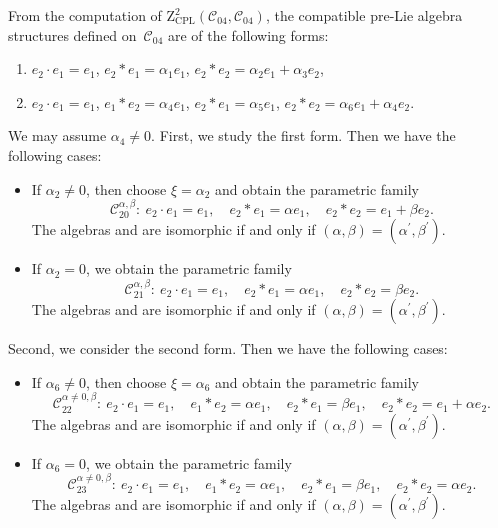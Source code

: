 \documentclass[pdftex]{sigma}
\numberwithin{equation}{section}
\begin{document}
From the computation of $\mathrm{Z}_{\mathrm{CPL}}^{2}(\mathcal{C}_{04},
\mathcal{C}_{04})$, the compatible pre-Lie algebra structures defined on~$\mathcal{C}_{04}$ are of the following forms:
\begin{enumerate}\itemsep=0pt
\item[(1)] $e_{2}\cdot e_{1}=e_{1}$,
$e_{2}\ast e_{1}=\alpha _{1}e_{1}$, $e_{2}\ast e_{2}=\alpha
_{2}e_{1}+\alpha _{3}e_{2}$,
\item[(2)] $e_{2}\cdot e_{1}=e_{1}$,
$e_{1}\ast e_{2}=\alpha _{4}e_{1}$, $e_{2}\ast e_{1}=\alpha _{5}e_{1}$, $e_{2}\ast e_{2}=\alpha _{6}e_{1}+\alpha _{4}e_{2}$.
\end{enumerate}

We may assume $\alpha _{4}\neq 0$.
First, we study the first form. Then
we have the following cases:
\begin{itemize}\itemsep=0pt
\item If $\alpha _{2}\neq 0$, then choose $\xi =\alpha _{2}$ and
obtain the parametric family
\[
\mathcal{C}_{20}^{\alpha ,\beta } \colon \
e_{2}\cdot e_{1}=e_{1}, \quad
e_{2}\ast e_{1}=\alpha e_{1}, \quad e_{2}\ast e_{2}=e_{1}+\beta e_{2}.
\]
The algebras  and \smash{$\mathcal{C}_{20}^{\alpha
^{\prime },\beta ^{\prime }}$} are isomorphic if and only if $(\alpha,\beta)= (\alpha^{\prime },\beta ^{\prime })$.

\item If $\alpha _{2}=0$, we obtain the parametric family
\[
\mathcal{C}_{21}^{\alpha ,\beta } \colon \
e_{2}\cdot e_{1}=e_{1}, \quad
e_{2}\ast e_{1}=\alpha e_{1},\quad e_{2}\ast e_{2}=\beta e_{2}.
\]
The algebras \smash{$\mathcal{C}_{21}^{\alpha ,\beta }$} and  are isomorphic if and only if $(\alpha,\beta)= (\alpha^{\prime },\beta ^{\prime })$.
\end{itemize}

Second, we consider the second form. Then we have the following cases:
\begin{itemize}\itemsep=0pt
\item If $\alpha _{6}\neq 0$, then choose $\xi =\alpha _{6}$ and
obtain the parametric family
\[
\mathcal{C}_{22}^{\alpha \neq 0,\beta } \colon \
e_{2}\cdot e_{1}=e_{1}, \quad
e_{1}\ast e_{2}=\alpha e_{1}, \quad e_{2}\ast e_{1}=\beta e_{1},\quad
e_{2}\ast e_{2}=e_{1}+\alpha e_{2}.
\]
The algebras \smash{$\mathcal{C}_{22}^{\alpha ,\beta }$} and \smash{$\mathcal{C}_{22}^{\alpha
^{\prime },\beta ^{\prime }}$} are isomorphic if and only if $(\alpha,\beta)= (\alpha^{\prime },\beta ^{\prime })$.

\item If $\alpha _{6}=0$, we obtain the parametric family
\[
\mathcal{C}_{23}^{\alpha \neq 0,\beta } \colon \
e_{2}\cdot e_{1}=e_{1}, \quad
e_{1}\ast e_{2}=\alpha e_{1}, \quad e_{2}\ast e_{1}=\beta e_{1}, \quad
e_{2}\ast e_{2}=\alpha e_{2}.
\]
The algebras  and \smash{$\mathcal{C}_{23}^{\alpha
^{\prime },\beta ^{\prime }}$} are isomorphic if and only if $(\alpha,\beta)= (\alpha^{\prime },\beta ^{\prime })$.
\end{itemize}
\end{document}
